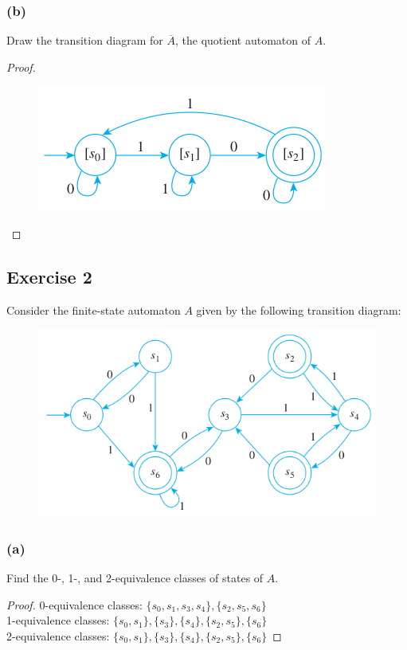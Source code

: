 \documentclass[14pt]{extarticle}
\begin{document}
\subsubsection{(b)}
Draw the transition diagram for \(\overline{A}\), the quotient automaton of \(A\).

\begin{proof}
\begin{figure}[ht!]
\centering
\includegraphics[scale=0.5]{../images/12.3.1.b.png}
\end{figure}
\end{proof}

\subsection{Exercise 2}
Consider the finite-state automaton \(A\) given by the following transition diagram:

\begin{figure}[ht!]
\centering
\includegraphics[scale=0.5]{../images/12.3.2.png}
\end{figure}

\subsubsection{(a)}
Find the 0-, 1-, and 2-equivalence classes of states of \(A\).
\begin{proof}
0-equivalence classes: \(\{s_0, s_1, s_3, s_4\}, \{s_2, s_5, s_6\}\) \\
1-equivalence classes: \(\{s_0, s_1\}, \{s_3\}, \{s_4\}, \{s_2, s_5\}, \{s_6\}\) \\
2-equivalence classes: \(\{s_0, s_1\}, \{s_3\}, \{s_4\}, \{s_2, s_5\}, \{s_6\}\)
\end{proof}
\end{document}
